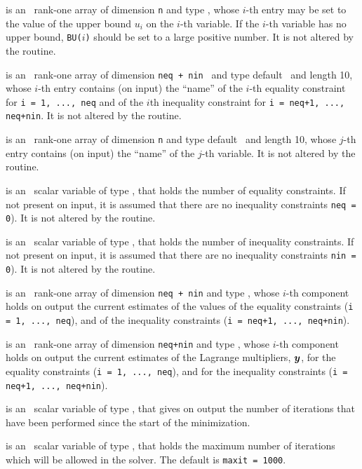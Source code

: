 \documentclass{galahad}
\begin{document}
\begin{description}
 is an \optional\ rank-one array of dimension {\tt n} and type
\realdp, whose $i$-th entry may be set
to the value of the upper bound $u_i$ on the $i$-th variable.
If the $i$-th variable has no upper bound, {\tt BU($i$)} should be set to
a large positive number.  It is not altered by the routine.

 is an \optional\  rank-one array of dimension {\tt neq + nin }
and type default \character\ and length 10, whose $i$-th entry contains (on
input) the ``name'' of the $i$-th equality constraint  for
{\tt i = 1, ..., neq} and of the $i$th inequality constraint for
{\tt i = neq+1, ..., neq+nin}.  It is not altered by the routine.

 is an \optional\ rank-one array of dimension {\tt n} and type
default \character\ and length 10, whose $j$-th entry contains (on input) the
``name'' of the $j$-th variable.  It is not altered by the routine.

 is an \optional\ scalar variable of type \integer, that holds
the number of equality constraints. If not present on input, it is assumed
that there are no inequality constraints {\tt neq = 0}). It is not altered by
the routine.

 is an \optional\ scalar variable of type \integer, that holds
the number of inequality constraints. If not present on input, it is assumed
that there are no inequality constraints {\tt nin = 0}). It is not altered by
the routine.

 is an \optional\ rank-one array of dimension {\tt neq + nin} and type
\realdp, whose $i$-th component holds on output the current
estimates of the values of the equality constraints ({\tt i = 1, ..., neq}),
and of the inequality constraints  ({\tt i = neq+1, ..., neq+nin}).

 is an \optional\ rank-one array of dimension {\tt neq+nin} and type
\realdp, whose $i$-th component holds on output the current
estimates of the Lagrange multipliers, ${\bm{y}}$, for the equality constraints
({\tt i = 1, ..., neq}), and for the inequality constraints  ({\tt i = neq+1,
  ..., neq+nin}).

 is an \optional\ scalar variable of type \integer, that gives
on output the number of iterations that have been performed since the start of
the  minimization.

 is an \optional\ scalar variable of type \integer, that
holds the maximum number of iterations which will be allowed in the solver.
The default is {\tt maxit = 1000}.


\end{description}
\end{document}
